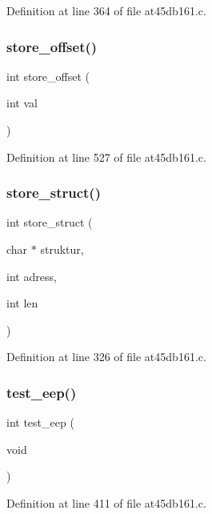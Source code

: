 Definition at line 364 of file at45db161.\+c.

\mbox{\label{at45db161_8c_a0d1acbab3520ceb76b879ed1b0186230}} 
\subsubsection{store\+\_\+offset()}
{\footnotesize\ttfamily int store\+\_\+offset (\begin{DoxyParamCaption}\item[{int}]{val }\end{DoxyParamCaption})}



Definition at line 527 of file at45db161.\+c.

\mbox{\label{at45db161_8c_a5d0a823ec7969bcb21f892a927718fcc}} 
\subsubsection{store\+\_\+struct()}
{\footnotesize\ttfamily int store\+\_\+struct (\begin{DoxyParamCaption}\item[{char $\ast$}]{struktur,  }\item[{int}]{adress,  }\item[{int}]{len }\end{DoxyParamCaption})}



Definition at line 326 of file at45db161.\+c.

\mbox{\label{at45db161_8c_a98cbe81d410e10f092759a1c7ee962e5}} 
\subsubsection{test\+\_\+eep()}
{\footnotesize\ttfamily int test\+\_\+eep (\begin{DoxyParamCaption}\item[{void}]{ }\end{DoxyParamCaption})}



Definition at line 411 of file at45db161.\+c.




